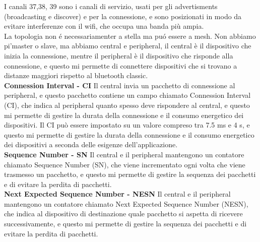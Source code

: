 I canali 37,38, 39 sono i canali di servizio, usati per gli advertisments (broadcasting e discover) e per la connessione, e sono posizionati in modo da evitare interferenze con il wifi, che occupa una banda più ampia.\\
La topologia non é necessariamenter a stella ma puó essere a mesh. Non abbiamo pi'master o slave, ma abbiamo central e peripheral, il central è il dispositivo che inizia la connessione, mentre il peripheral è il dispositivo che risponde alla connessione, e questo mi permette di connettere dispositivi che si trovano a distanze maggiori rispetto al bluetooth classic.\\
 
\textbf{Connession Interval - CI} Il central invia un pacchetto di connessione al peripheral, e questo pacchetto contiene un campo chiamato Connession Interval (CI), che indica al peripheral quanto spesso deve rispondere al central, e questo mi permette di gestire la durata della connessione e il consumo energetico dei dispositivi. Il CI può essere impostato su un valore compreso tra 7.5 ms e 4 s, e questo mi permette di gestire la durata della connessione e il consumo energetico dei dispositivi a seconda delle esigenze dell'applicazione.\\

\textbf{Sequence Number - SN} Il central e il peripheral mantengono un contatore chiamato Sequence Number (SN), che viene incrementato ogni volta che viene trasmesso un pacchetto, e questo mi permette di gestire la sequenza dei pacchetti e di evitare la perdita di pacchetti.\\

\textbf{Next Expected Sequence Number - NESN} Il central e il peripheral mantengono un contatore chiamato Next Expected Sequence Number (NESN), che indica al dispositivo di destinazione quale pacchetto si aspetta di ricevere successivamente, e questo mi permette di gestire la sequenza dei pacchetti e di evitare la perdita di pacchetti.\\

